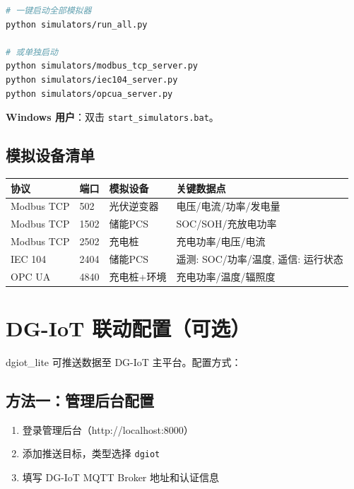 \documentclass[12pt,a4paper]{ctexart}
\begin{document}
\begin{lstlisting}[language=bash]
# 一键启动全部模拟器
python simulators/run_all.py

# 或单独启动
python simulators/modbus_tcp_server.py
python simulators/iec104_server.py
python simulators/opcua_server.py
\end{lstlisting}

\noindent\textbf{Windows 用户}：双击 \texttt{start\_simulators.bat}。

\subsection{模拟设备清单}

\begin{table}[H]\centering
\begin{tabular}{p{3cm}p{2cm}p{2.5cm}p{4cm}}
\toprule\textbf{协议} & \textbf{端口} & \textbf{模拟设备} & \textbf{关键数据点} \\
\midrule
Modbus TCP & 502   & 光伏逆变器 & 电压/电流/功率/发电量 \\
Modbus TCP & 1502  & 储能PCS    & SOC/SOH/充放电功率 \\
Modbus TCP & 2502  & 充电桩     & 充电功率/电压/电流 \\
IEC 104    & 2404  & 储能PCS    & 遥测: SOC/功率/温度, 遥信: 运行状态 \\
OPC UA     & 4840  & 充电桩+环境 & 充电功率/温度/辐照度 \\
\bottomrule
\end{tabular}
\end{table}

\section{DG-IoT 联动配置（可选）}

dgiot\_lite 可推送数据至 DG-IoT 主平台。配置方式：

\subsection{方法一：管理后台配置}

\begin{enumerate}[leftmargin=*]
  \item 登录管理后台（http://localhost:8000）
  \item 添加推送目标，类型选择 \texttt{dgiot}
  \item 填写 DG-IoT MQTT Broker 地址和认证信息
\end{enumerate}
\end{document}
